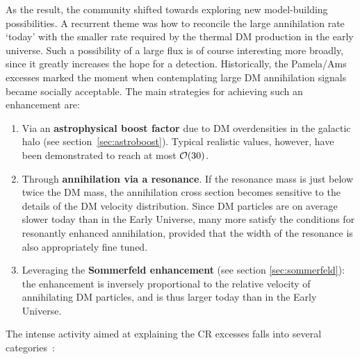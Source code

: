 As the result, the community shifted towards exploring new model-building possibilities. A recurrent theme was how to reconcile the large annihilation rate `today' with the smaller rate required by the thermal DM production in the early universe. 
Such a possibility of a  large flux is of course interesting more broadly, since it greatly increases the hope for a detection. Historically, the {\sc Pamela/Ams} excesses marked the moment when contemplating large DM annihilation signals became socially acceptable. 
The main strategies for achieving such an enhancement are:
\begin{enumerate}
\item[a)] Via an {\bf astrophysical boost factor} due to DM overdensities in the galactic halo (see section~\ref{sec:astroboost}). Typical realistic values, however, have been demonstrated to reach at most ${\cal O}(30)$.
\item[b)] Through {\bf annihilation via a resonance}. If the resonance mass is just below twice the DM mass, the annihilation cross section becomes sensitive to the details of the DM velocity distribution. Since DM particles are on average slower today than in the Early Universe, 
many more satisfy the conditions for resonantly enhanced annihilation, provided that the width of the resonance is also appropriately fine tuned.
\item[c)] Leveraging the {\bf Sommerfeld enhancement} (see section \ref{sec:sommerfeld}): 
the enhancement is inversely proportional to the relative velocity of annihilating DM particles,
and is thus larger today than in the Early Universe. 
\end{enumerate}



\smallskip

The intense activity aimed at explaining  the CR excesses falls into several categories~\cite{positronexcessmodels}:

